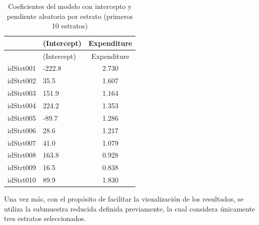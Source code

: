 \documentclass[
  spanish,
  12pt,
]{book}
\newenvironment{Shaded}{\begin{snugshade}}{\end{snugshade}}
\newcommand{\AttributeTok}[1]{\textcolor[rgb]{0.13,0.29,0.53}{#1}}
\newcommand{\DataTypeTok}[1]{\textcolor[rgb]{0.13,0.29,0.53}{#1}}
\newcommand{\DecValTok}[1]{\textcolor[rgb]{0.00,0.00,0.81}{#1}}
\newcommand{\FunctionTok}[1]{\textcolor[rgb]{0.13,0.29,0.53}{\textbf{#1}}}
\newcommand{\NormalTok}[1]{#1}
\newcommand{\OtherTok}[1]{\textcolor[rgb]{0.56,0.35,0.01}{#1}}
\newcommand{\SpecialCharTok}[1]{\textcolor[rgb]{0.81,0.36,0.00}{\textbf{#1}}}
\newcommand{\StringTok}[1]{\textcolor[rgb]{0.31,0.60,0.02}{#1}}
\begin{document}
\begin{Shaded}
\end{Shaded}

\begin{longtable}[]{@{}llc@{}}
\caption{\label{tab:tab-coef-pendiente-aleatoria}Coeficientes del modelo con intercepto y pendiente aleatoria por estrato (primeros 10 estratos)}\tabularnewline
\toprule\noalign{}
& (Intercept) & Expenditure \\
\midrule\noalign{}
\endfirsthead
\toprule\noalign{}
& (Intercept) & Expenditure \\
\midrule\noalign{}
\endhead
\bottomrule\noalign{}
\endlastfoot
idStrt001 & -222.8 & 2.730 \\
idStrt002 & 35.5 & 1.607 \\
idStrt003 & 151.9 & 1.164 \\
idStrt004 & 224.2 & 1.353 \\
idStrt005 & -89.7 & 1.286 \\
idStrt006 & 28.6 & 1.217 \\
idStrt007 & 41.0 & 1.079 \\
idStrt008 & 163.8 & 0.928 \\
idStrt009 & 16.5 & 0.838 \\
idStrt010 & 89.9 & 1.830 \\
\end{longtable}

Una vez más, con el propósito de facilitar la visualización de los resultados, se utiliza la submuestra reducida definida previamente, la cual considera únicamente tres estratos seleccionados.

\begin{Shaded}
\end{Shaded}
\end{document}
